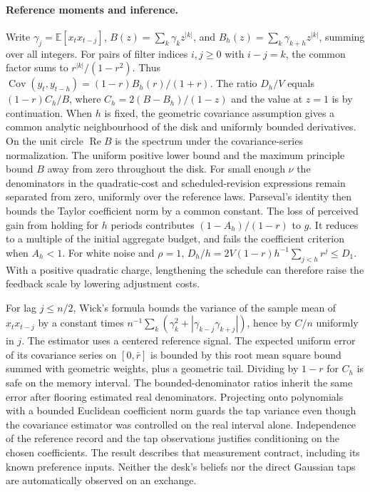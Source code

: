 \documentclass[12pt]{article}
\theoremstyle{definition}
\theoremstyle{remark}
\begin{document}
\paragraph{Reference moments and inference.}
Write $\gamma_j=\mathbb E[x_t x_{t-j}]$, $B(z)=\sum_k\gamma_k z^{|k|}$, and
$B_h(z)=\sum_k\gamma_{k+h}z^{|k|}$, summing over all integers. For pairs of filter
indices $i,j\ge0$ with $i-j=k$, the common factor sums to $r^{|k|}/(1-r^2)$. Thus
$\operatorname{Cov}(y_t,y_{t-h})=(1-r)B_h(r)/(1+r)$. The ratio $D_h/V$ equals
$(1-r)C_h/B$, where $C_h=2(B-B_h)/(1-z)$ and the value at $z=1$ is by continuation.
When $h$ is fixed, the geometric covariance assumption gives a common analytic
neighbourhood of the disk and uniformly bounded derivatives. On the unit circle
$\operatorname{Re}B$ is the spectrum under the covariance-series normalization.
The uniform positive lower bound and the maximum principle bound $B$ away from zero
throughout the disk. For small enough $\nu$ the denominators in the quadratic-cost
and scheduled-revision expressions remain separated from zero, uniformly over the
reference laws. Parseval's identity then bounds the Taylor coefficient norm by a
common constant. The loss of perceived gain from holding for $h$ periods contributes
$(1-A_h)/(1-r)$ to $g$. It reduces to a multiple of the initial aggregate budget,
and fails the coefficient criterion when $A_h<1$. For white noise and $\rho=1$,
$D_h/h=2V(1-r)h^{-1}\sum_{j<h}r^j\le D_1$. With a positive quadratic charge,
lengthening the schedule can therefore raise the feedback scale by lowering
adjustment costs.

For lag $j\le n/2$, Wick's formula bounds the variance of the sample mean of
$x_t x_{t-j}$ by a constant times $n^{-1}\sum_k(\gamma_k^2+
|\gamma_{k-j}\gamma_{k+j}|)$, hence by $C/n$ uniformly in $j$. The estimator uses a
centered reference signal. The expected uniform error of its covariance series on
$[0,\bar r]$ is bounded by this root mean square bound summed with geometric weights,
plus a geometric tail. Dividing by $1-r$ for $C_h$ is safe on the memory interval.
The bounded-denominator ratios inherit the same error after flooring estimated real
denominators. Projecting onto polynomials with a bounded Euclidean coefficient norm
guards the tap variance even though the covariance estimator was controlled on the
real interval alone. Independence of the reference record and the tap observations
justifies conditioning on the chosen coefficients. The result describes that
measurement contract, including its known preference inputs. Neither the desk's
beliefs nor the direct Gaussian taps are automatically observed on an exchange.
\end{document}
